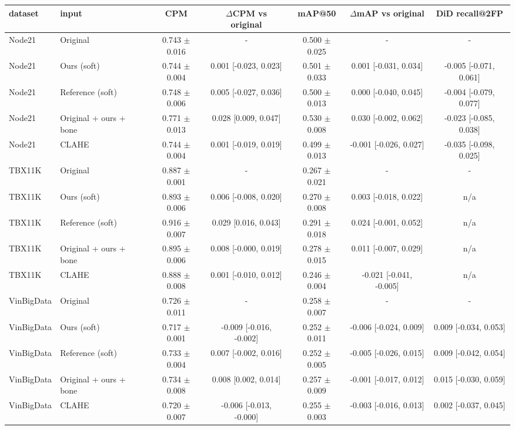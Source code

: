 \begin{tabular}{llccccc}
\toprule
dataset & input & CPM & $\Delta$CPM vs original & mAP@50 & $\Delta$mAP vs original & DiD recall@2FP \\
\midrule
Node21 & Original & 0.743 $\pm$ 0.016 & - & 0.500 $\pm$ 0.025 & - & - \\
Node21 & Ours (soft) & 0.744 $\pm$ 0.004 & 0.001 [-0.023, 0.023] & 0.501 $\pm$ 0.033 & 0.001 [-0.031, 0.034] & -0.005 [-0.071, 0.061] \\
Node21 & Reference (soft) & 0.748 $\pm$ 0.006 & 0.005 [-0.027, 0.036] & 0.500 $\pm$ 0.013 & 0.000 [-0.040, 0.045] & -0.004 [-0.079, 0.077] \\
Node21 & Original + ours + bone & 0.771 $\pm$ 0.013 & 0.028 [0.009, 0.047] & 0.530 $\pm$ 0.008 & 0.030 [-0.002, 0.062] & -0.023 [-0.085, 0.038] \\
Node21 & CLAHE & 0.744 $\pm$ 0.004 & 0.001 [-0.019, 0.019] & 0.499 $\pm$ 0.013 & -0.001 [-0.026, 0.027] & -0.035 [-0.098, 0.025] \\
TBX11K & Original & 0.887 $\pm$ 0.001 & - & 0.267 $\pm$ 0.021 & - & - \\
TBX11K & Ours (soft) & 0.893 $\pm$ 0.006 & 0.006 [-0.008, 0.020] & 0.270 $\pm$ 0.008 & 0.003 [-0.018, 0.022] & n/a \\
TBX11K & Reference (soft) & 0.916 $\pm$ 0.007 & 0.029 [0.016, 0.043] & 0.291 $\pm$ 0.018 & 0.024 [-0.001, 0.052] & n/a \\
TBX11K & Original + ours + bone & 0.895 $\pm$ 0.006 & 0.008 [-0.000, 0.019] & 0.278 $\pm$ 0.015 & 0.011 [-0.007, 0.029] & n/a \\
TBX11K & CLAHE & 0.888 $\pm$ 0.008 & 0.001 [-0.010, 0.012] & 0.246 $\pm$ 0.004 & -0.021 [-0.041, -0.005] & n/a \\
VinBigData & Original & 0.726 $\pm$ 0.011 & - & 0.258 $\pm$ 0.007 & - & - \\
VinBigData & Ours (soft) & 0.717 $\pm$ 0.001 & -0.009 [-0.016, -0.002] & 0.252 $\pm$ 0.011 & -0.006 [-0.024, 0.009] & 0.009 [-0.034, 0.053] \\
VinBigData & Reference (soft) & 0.733 $\pm$ 0.004 & 0.007 [-0.002, 0.016] & 0.252 $\pm$ 0.005 & -0.005 [-0.026, 0.015] & 0.009 [-0.042, 0.054] \\
VinBigData & Original + ours + bone & 0.734 $\pm$ 0.008 & 0.008 [0.002, 0.014] & 0.257 $\pm$ 0.009 & -0.001 [-0.017, 0.012] & 0.015 [-0.030, 0.059] \\
VinBigData & CLAHE & 0.720 $\pm$ 0.007 & -0.006 [-0.013, -0.000] & 0.255 $\pm$ 0.003 & -0.003 [-0.016, 0.013] & 0.002 [-0.037, 0.045] \\
\bottomrule
\end{tabular}

